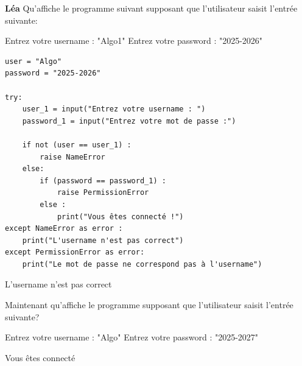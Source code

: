\begin{Exercice}[5 minutes]\textbf{Léa}
Qu'affiche le programme suivant supposant que l'utilisateur saisit l'entrée suivante:

Entrez votre username : "Algo1"
Entrez votre password : "2025-2026"

\begin{lstlisting}[style=pythonstyle]
user = "Algo"
password = "2025-2026"

try:
    user_1 = input("Entrez votre username : ")
    password_1 = input("Entrez votre mot de passe :")

    if not (user == user_1) :
        raise NameError
    else:
        if (password == password_1) :
            raise PermissionError
        else :
            print("Vous êtes connecté !")
except NameError as error :
    print("L'username n'est pas correct")
except PermissionError as error:
    print("Le mot de passe ne correspond pas à l'username")
\end{lstlisting}

\begin{solution}
L'username n'est pas correct 
\end{solution}

Maintenant qu'affiche le programme supposant que l'utilisateur saisit l'entrée suivante? \newline 

Entrez votre username : "Algo" \newline 
Entrez votre password : "2025-2027"


\begin{solution}
Vous êtes connecté
\end{solution}


\end{Exercice}

